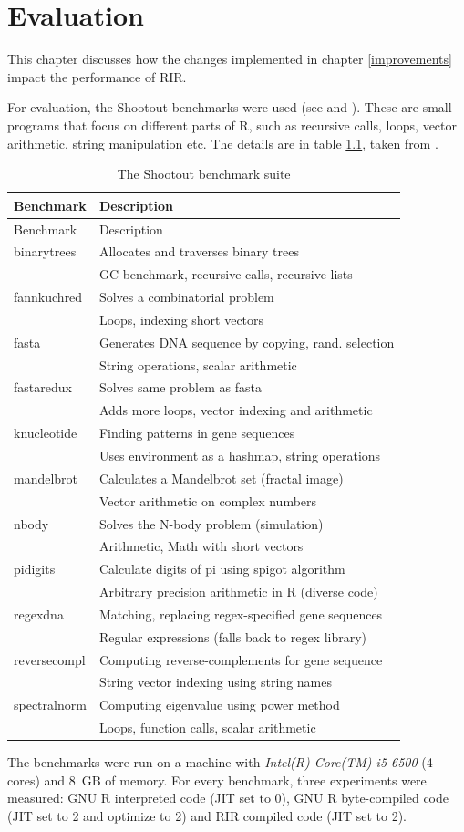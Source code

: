 \chapter{Evaluation\label{evaluation}}

This chapter discusses how the changes implemented in chapter \ref{improvements} impact the performance of RIR.

For evaluation, the Shootout benchmarks were used (see \autocite{shootout} and \autocite{fastr}). These are small programs that focus on different parts of R, such as recursive calls, loops, vector arithmetic, string manipulation etc. The details are in table \ref{tab:shootout}, taken from \autocite{fastr}.

\begin{longtable}[c]{@{}ll@{}}
\caption{The Shootout benchmark suite\label{tab:shootout}} \tabularnewline
\toprule
Benchmark & Description \tabularnewline
\midrule
\endfirsthead
\toprule
Benchmark & Description \tabularnewline
\midrule
\endhead
binarytrees & Allocates and traverses binary trees \tabularnewline
& GC benchmark, recursive calls, recursive lists \tabularnewline
fannkuchred & Solves a combinatorial problem \tabularnewline
& Loops, indexing short vectors \tabularnewline
fasta & Generates DNA sequence by copying, rand. selection \tabularnewline
& String operations, scalar arithmetic \tabularnewline
fastaredux & Solves same problem as fasta \tabularnewline
& Adds more loops, vector indexing and arithmetic \tabularnewline
knucleotide & Finding patterns in gene sequences \tabularnewline
& Uses environment as a hashmap, string operations \tabularnewline
mandelbrot & Calculates a Mandelbrot set (fractal image) \tabularnewline
& Vector arithmetic on complex numbers \tabularnewline
nbody & Solves the N-body problem (simulation) \tabularnewline
& Arithmetic, Math with short vectors \tabularnewline
pidigits & Calculate digits of pi using spigot algorithm \tabularnewline
& Arbitrary precision arithmetic in R (diverse code) \tabularnewline
regexdna & Matching, replacing regex-specified gene sequences \tabularnewline
& Regular expressions (falls back to regex library) \tabularnewline
reversecompl & Computing reverse-complements for gene sequence \tabularnewline
& String vector indexing using string names \tabularnewline
spectralnorm & Computing eigenvalue using power method \tabularnewline
& Loops, function calls, scalar arithmetic \tabularnewline
\bottomrule
\end{longtable}

The benchmarks were run on a machine with \emph{Intel(R) Core(TM) i5-6500} (4 cores) and 8~GB of memory. For every benchmark, three experiments were measured: GNU R interpreted code (JIT set to 0), GNU R byte-compiled code (JIT set to 2 and optimize to 2) and RIR compiled code (JIT set to 2).

